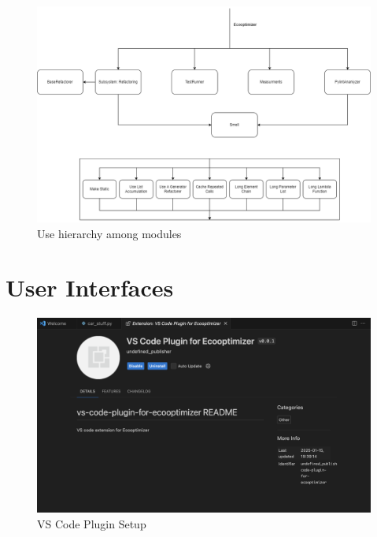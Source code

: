 \documentclass[12pt, titlepage]{article}
\begin{document}

\begin{figure}[H]
\centering
\includegraphics[width=\textwidth]{../../Images/use_hierarchy_modules.png}
\caption{Use hierarchy among modules}
\label{FigUH}
\end{figure}


\section{User Interfaces}

\begin{figure}[H]
  \centering
  \includegraphics[width=\textwidth]{../../Images/VSPlugin.png}
  \caption{VS Code Plugin Setup}
  \label{FigUH}
  \end{figure}
  
\end{document}
